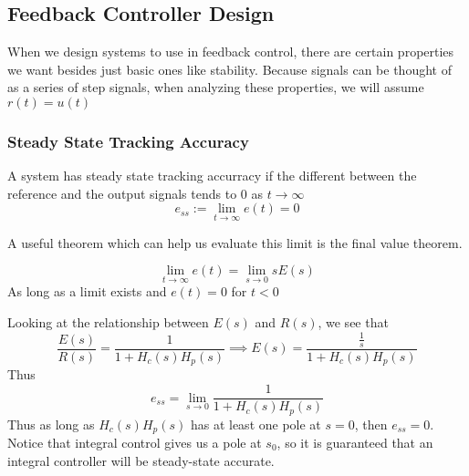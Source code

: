 \subsection{Feedback Controller Design}
When we design systems to use in feedback control, there are certain properties we want besides just basic ones like stability.
Because signals can be thought of as a series of step signals, when analyzing these properties,
we will assume $r(t)=u(t)$ 
\subsubsection{Steady State Tracking Accuracy}
\begin{gitbook-image}
\begin{figure}[H]
    \centering
    
\end{figure}
\end{gitbook-image}
\begin{definition}
    A system has steady state tracking accurracy if the different between the reference and the output signals
    tends to 0 as $t\rightarrow \infty$
    \[
e_{ss} := \lim_{t\rightarrow\infty}{e(t)}=0
\]
\end{definition}
A useful theorem which can help us evaluate this limit is the final value theorem.
\begin{theorem}
    \[
\lim_{t\rightarrow\infty}{e(t)} = \lim_{s\rightarrow0}{sE(s)}
\]
    As long as a limit exists and $e(t)=0$ for $t<0$
\end{theorem}
Looking at the relationship between $E(s)$ and $R(s)$, we see that 
\[
\frac{E(s)}{R(s)} = \frac{1}{1+H_c(s)H_p(s)} \implies E(s) = \frac{\frac{1}{s}}{1+H_c(s)H_p(s)}
\]
Thus
\[
e_{ss}=\lim_{s\rightarrow0}{\frac{1}{1+H_c(s)H_p(s)}}
\]
Thus as long as $H_c(s)H_p(s)$ has at least one pole at $s=0$, then $e_{ss}=0$.
Notice that integral control gives us a pole at $s_0$, so it is guaranteed that an integral controller will be steady-state accurate.
